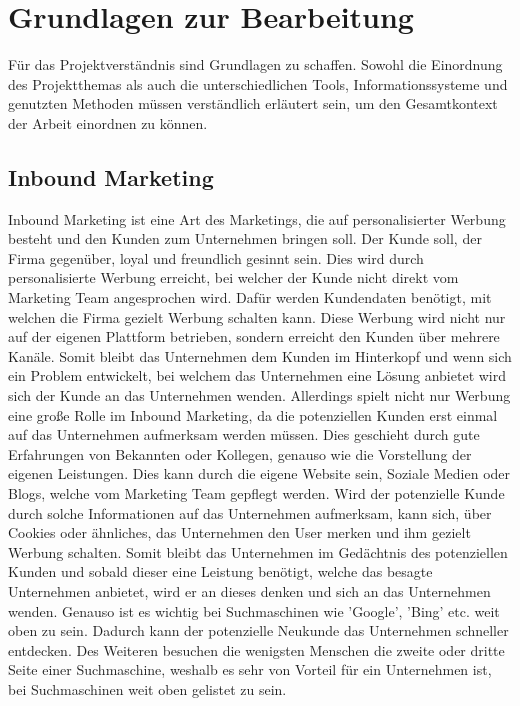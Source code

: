 \section{Grundlagen zur Bearbeitung}
Für das Projektverständnis sind Grundlagen zu schaffen. Sowohl die Einordnung des Projektthemas
als auch die unterschiedlichen Tools, Informationssysteme und genutzten Methoden müssen verständlich erläutert sein, um den Gesamtkontext der Arbeit einordnen zu können.

\subsection{Inbound Marketing}
Inbound Marketing ist eine Art des Marketings, die auf personalisierter Werbung besteht und den Kunden zum Unternehmen bringen soll. Der Kunde soll, der Firma gegenüber, loyal und freundlich gesinnt sein. Dies wird durch personalisierte Werbung erreicht, bei welcher der Kunde nicht direkt vom Marketing Team angesprochen wird. Dafür werden Kundendaten benötigt, mit welchen die Firma gezielt Werbung schalten kann. Diese Werbung wird nicht nur auf der eigenen Plattform betrieben, sondern erreicht den Kunden über mehrere Kanäle. Somit bleibt das Unternehmen dem Kunden im Hinterkopf und wenn sich ein Problem entwickelt, bei welchem das Unternehmen eine Lösung anbietet wird sich der Kunde an das  Unternehmen wenden.
\newline 
Allerdings spielt nicht nur Werbung eine große Rolle im Inbound Marketing, da die potenziellen Kunden erst einmal auf das Unternehmen aufmerksam werden müssen. Dies geschieht durch gute Erfahrungen von Bekannten oder Kollegen, genauso wie die Vorstellung der eigenen Leistungen. Dies kann durch die eigene Website sein, Soziale Medien oder Blogs, welche vom Marketing Team gepflegt werden. Wird der potenzielle Kunde durch solche Informationen auf das Unternehmen aufmerksam, kann sich, über Cookies oder ähnliches, das Unternehmen den User merken und ihm gezielt Werbung schalten. Somit bleibt das Unternehmen im Gedächtnis des potenziellen Kunden und sobald dieser eine Leistung benötigt, welche das besagte Unternehmen anbietet, wird er an dieses denken und sich an das Unternehmen wenden. Genauso ist es wichtig bei Suchmaschinen wie 'Google', 'Bing' etc. weit oben zu sein. Dadurch kann der potenzielle Neukunde das Unternehmen schneller entdecken. Des Weiteren besuchen die wenigsten Menschen die zweite oder dritte Seite einer Suchmaschine, weshalb es sehr von Vorteil für ein Unternehmen ist, bei Suchmaschinen weit oben gelistet zu sein.
